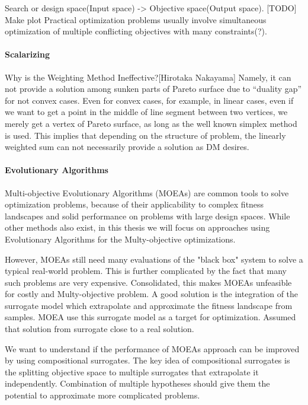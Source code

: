         Search or design space(Input space) -> Objective space(Output space).
        [TODO] Make plot 
        Practical optimization problems usually involve simultaneous optimization of multiple conflicting objectives with many constraints(?).

        \paragraph{Scalarizing}
        Why is the Weighting Method Ineffective?[Hirotaka Nakayama]
        Namely, it can not provide a solution among sunken parts of Pareto surface due to “duality gap” for not convex cases. 
        Even for convex cases, for example, in linear cases, even if we want to get a point in the middle of line segment between two vertices, we merely get a vertex of Pareto surface, as
        long as the well known simplex method is used. This implies that depending on the structure of problem, the linearly weighted sum can not necessarily provide a solution as DM desires.

        \paragraph{Evolutionary Algorithms}
        Multi-objective Evolutionary Algorithms (MOEAs) are common tools to solve optimization problems, 
        because of their applicability to complex fitness landscapes and solid performance on problems with large design spaces. 
        While other methods also exist, in this thesis we will focus on approaches using Evolutionary Algorithms for the Multy-objective optimizations.

        However, MOEAs still need many evaluations of the "black box" system to solve a typical real-world problem. 
        This is further complicated by the fact that many such problems are very expensive. Consolidated, this makes MOEAs unfeasible for costly and Multy-objective problem.
         A good solution is the integration of the surrogate model which extrapolate and approximate the fitness landscape from samples. MOEA use this surrogate model 
         as a target for optimization. Assumed that solution from surrogate close to a real solution.
        
        We want to understand if the performance of MOEAs approach can be improved by using compositional surrogates. 
        The key idea of compositional surrogates is the splitting objective space to multiple surrogates that extrapolate it independently. 
        Combination of multiple hypotheses should give them the potential to approximate more complicated problems. 

